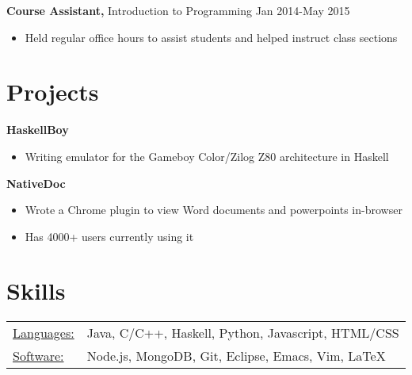 \documentclass[margin]{res}
\begin{document}
\begin{resume}
                          {\bf Course Assistant,} Introduction to Programming \hfill Jan 2014-May 2015 \parskip -2pt
                          \begin{itemize} \itemsep -3pt
                          \item Held regular office hours to assist students and helped instruct class sections
                          \end{itemize}                              

                  \section{Projects}
                          {\bf HaskellBoy}
                          \begin{itemize} \itemsep -3pt
                          \item Writing emulator for the Gameboy Color/Zilog Z80 architecture in Haskell \smallskip
                          \end{itemize}
                          
                          {\bf NativeDoc}
                          \begin{itemize} \itemsep -3pt
                          \item Wrote a Chrome plugin to view Word documents and powerpoints in-browser
                          \item Has 4000+ users currently using it
                          \end{itemize}
                  
                  \section{Skills}
                  \begin{tabular}{l p{3in}}
                    \underline{Languages:} & Java, C/C++, Haskell, Python, Javascript, HTML/CSS\\
                    \underline{Software:} &  Node.js, MongoDB, Git, Eclipse, Emacs, Vim, \LaTeX
                  \end{tabular}

\end{resume}
\end{document}
